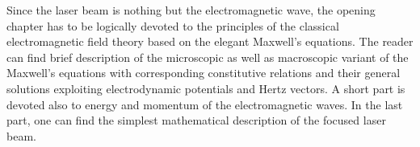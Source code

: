 Since the laser beam is nothing but the electromagnetic wave, the opening chapter has to be logically devoted to the principles of the classical electromagnetic field theory based on the elegant Maxwell's equations. The reader can find brief description of the microscopic as well as macroscopic variant of the Maxwell's equations with corresponding constitutive relations and their general solutions exploiting electrodynamic potentials and Hertz vectors. A short part is devoted also to energy and momentum of the electromagnetic waves. In the last part, one can find the simplest mathematical description of the focused laser beam.
